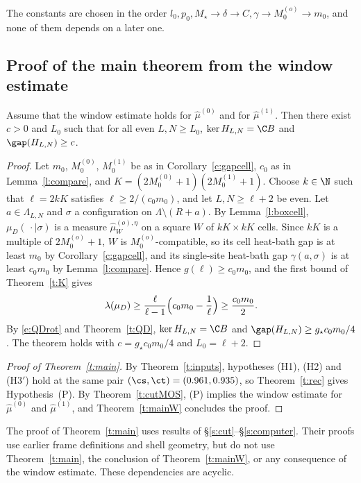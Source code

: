 The constants are chosen in the order $l_0, p_0, M_\star \to \delta \to C, \gamma \to M_0^{(o)} \to m_0$, and none of them depends on a later one.

\subsection{Proof of the main theorem from the window estimate}\label{s:proofmain}

\begin{theorem}\label{t:mainW}
Assume that the window estimate holds for $\hat\mu^{(0)}$ and for $\hat\mu^{(1)}$. Then there exist $c > 0$ and $L_0$ such that for all even $L, N \ge L_0$, $\ker H_{L, N} = \C B$ and $\gap(H_{L, N}) \ge c$.
\end{theorem}

\begin{proof}
Let $m_0$, $M_0^{(0)}$, $M_0^{(1)}$ be as in Corollary~\ref{c:gapcell}, $c_0$ as in Lemma~\ref{l:compare}, and $K = (2M_0^{(0)} + 1)(2M_0^{(1)} + 1)$. Choose $k \in \N$ such that $\ell = 2kK$ satisfies $\ell \ge 2/(c_0 m_0)$, and let $L, N \ge \ell + 2$ be even. Let $a \in \Lambda_{L, N}$ and $\sigma$ a configuration on $\Lambda \setminus (R + a)$. By Lemma~\ref{l:boxcell}, $\mu_D(\, \cdot \mid \sigma)$ is a measure $\hat\mu^{(o), \eta}_W$ on a square $W$ of $kK \times kK$ cells. Since $kK$ is a multiple of $2 M_0^{(o)} + 1$, $W$ is $M_0^{(o)}$-compatible, so its cell heat-bath gap is at least $m_0$ by Corollary~\ref{c:gapcell}, and its single-site heat-bath gap $\gamma(a, \sigma)$ is at least $c_0 m_0$ by Lemma~\ref{l:compare}. Hence $g(\ell) \ge c_0 m_0$, and the first bound of Theorem~\ref{t:K} gives
\begin{equation*}
\lambda(\mu_D) \ge \frac{\ell}{\ell - 1} \Bigl( c_0 m_0 - \frac1\ell \Bigr) \ge \frac{c_0 m_0}{2} .
\end{equation*}
By \eqref{e:QDrot} and Theorem~\ref{t:QD}, $\ker H_{L, N} = \C B$ and $\gap(H_{L, N}) \ge g_\star c_0 m_0 / 4$. The theorem holds with $c = g_\star c_0 m_0/4$ and $L_0 = \ell + 2$.
\end{proof}

\begin{proof}[Proof of Theorem~\ref{t:main}]
By Theorem~\ref{t:inputs}, hypotheses (H1), (H2) and (H3$'$) hold at the same pair $(\cs, \ct) = (0.961, 0.935)$, so Theorem~\ref{t:rec} gives Hypothesis~(P). By Theorem~\ref{t:cutMOS}, (P) implies the window estimate for $\hat\mu^{(0)}$ and $\hat\mu^{(1)}$, and Theorem~\ref{t:mainW} concludes the proof.
\end{proof}

The proof of Theorem~\ref{t:main} uses results of \S\ref{s:cut}--\S\ref{s:computer}. Their proofs use earlier frame definitions and shell geometry, but do not use Theorem~\ref{t:main}, the conclusion of Theorem~\ref{t:mainW}, or any consequence of the window estimate. These dependencies are acyclic.
